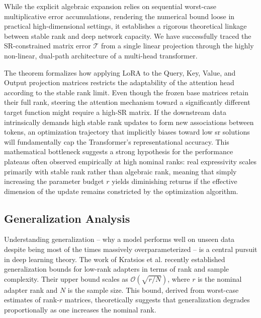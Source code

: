 \documentclass[a4paper,14pt]{extarticle}
\begin{document}
    While the explicit algebraic expansion relies on sequential worst-case multiplicative error accumulations, rendering the numerical bound loose in practical high-dimensional settings, it establishes a rigorous theoretical linkage between stable rank and deep network capacity. We have successfully traced the SR-constrained matrix error $\mathcal{T}$ from a single linear projection through the highly non-linear, dual-path architecture of a multi-head transformer. 
    
    The theorem formalizes how applying LoRA to the Query, Key, Value, and Output projection matrices restricts the adaptability of the attention head according to the stable rank limit. Even though the frozen base matrices retain their full rank, steering the attention mechanism toward a significantly different target function might require a high-SR matrix. If the downstream data intrinsically demands high stable rank updates to form new associations between tokens, an optimization trajectory that implicitly biases toward low sr solutions will fundamentally cap the Transformer's representational accuracy. This mathematical bottleneck suggests a strong hypothesis for the performance plateaus often observed empirically at high nominal ranks: real expressivity scales primarily with stable rank rather than algebraic rank, meaning that simply increasing the parameter budget $r$ yields diminishing returns if the effective dimension of the update remains constricted by the optimization algorithm.



    \subsection{Generalization Analysis}

    Understanding generalization -- why a model performs well on unseen data despite being most of the times massively overparameterized -- is a central pursuit in deep learning theory. The work of Kratsios et al. \cite{kratsios2025sharpgeneralizationboundsfoundation} recently established generalization bounds for low-rank adapters in terms of rank and sample complexity. Their upper bound scales as $\mathcal{O}(\sqrt{r/N})$, where $r$ is the nominal adapter rank and $N$ is the sample size. This bound, derived from worst-case estimates of rank-$r$ matrices, theoretically suggests that generalization degrades proportionally as one increases the nominal rank. 
    
\end{document}
